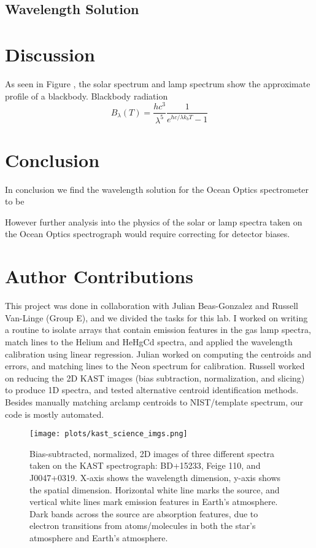 \documentclass[preprint]{aastex62}
\begin{document}
\subsection{Wavelength Solution}


\section{Discussion} \label{sec:discussion}
As seen in Figure , the solar spectrum and lamp spectrum show the approximate profile of a blackbody. Blackbody radiation
\begin{equation}
    B_{\lambda}(T) = \frac{hc^3}{\lambda^5}\frac{1}{e^{hc/\lambda k_b T} - 1}
\end{equation}

\section{Conclusion}
In conclusion we find the wavelength solution for the Ocean Optics spectrometer to be

However further analysis into the physics of the solar or lamp spectra taken on the Ocean Optics spectrograph would require correcting for detector biases.

\section{Author Contributions}
This project was done in collaboration with Julian Beas-Gonzalez and Russell Van-Linge (Group
E), and we divided the tasks for this lab. I worked on writing a routine to isolate arrays that contain emission features in the gas lamp spectra, match lines to the Helium and HeHgCd spectra, and applied the wavelength calibration using linear regression. Julian worked on computing the centroids and errors, and matching lines to the Neon spectrum for calibration. Russell worked on reducing the 2D KAST images (bias subtraction, normalization, and slicing) to produce 1D spectra, and tested alternative centroid identification methods. Besides manually matching arclamp centroids to NIST/template spectrum, our code is mostly automated.

\begin{figure}[H]
\begin{center}
\texttt{[image: plots/kast\_science\_imgs.png]} 
\caption{Bias-subtracted, normalized, 2D images of three different spectra taken on the KAST spectrograph: BD+15233, Feige 110, and J0047+0319. X-axis shows the wavelength dimension, y-axis shows the spatial dimension. Horizontal white line marks the source, and vertical white lines mark emission features in Earth's atmosphere. Dark bands across the source are absorption features, due to electron transitions from atoms/molecules in both the star's atmosphere and Earth's atmosphere.} \label{fig:science_images}
\end{center}
\end{figure}
\end{document}
